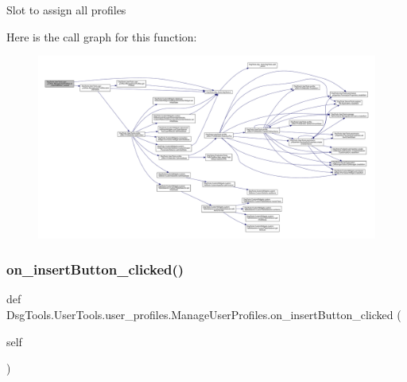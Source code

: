 \begin{DoxyVerb}Slot to assign all profiles
\end{DoxyVerb}
 Here is the call graph for this function\+:
\nopagebreak
\begin{figure}[H]
\begin{center}
\leavevmode
\includegraphics[width=350pt]{class_dsg_tools_1_1_user_tools_1_1user__profiles_1_1_manage_user_profiles_a8aa13a0696007e61005d54b7babd9f80_cgraph}
\end{center}
\end{figure}
\mbox{\label{class_dsg_tools_1_1_user_tools_1_1user__profiles_1_1_manage_user_profiles_a21c06c53c95cc88bc49c7bb4dc6bfcc3}} 
\subsubsection{\texorpdfstring{on\+\_\+insert\+Button\+\_\+clicked()}{on\_insertButton\_clicked()}}
{\footnotesize\ttfamily def Dsg\+Tools.\+User\+Tools.\+user\+\_\+profiles.\+Manage\+User\+Profiles.\+on\+\_\+insert\+Button\+\_\+clicked (\begin{DoxyParamCaption}\item[{}]{self }\end{DoxyParamCaption})}

